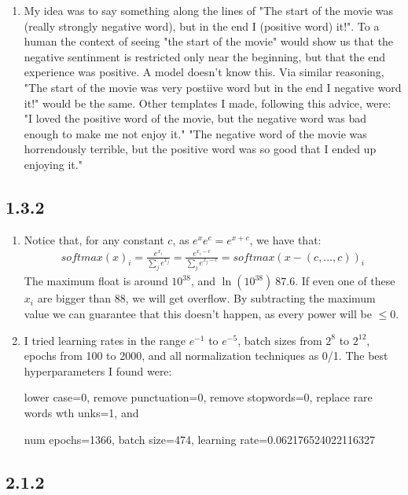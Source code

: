 \documentclass[12pt]{article}
\theoremstyle{definitionstyle}
\begin{document}
\begin{enumerate}[leftmargin=\labelsep]
        \item My idea was to say something along the lines of "The start of the movie was (really strongly negative word), but in the end I (positive word) it!". To a human the context of seeing "the start of the movie" would show us that the negative sentinment is restricted only near the beginning, but that the end experience was positive. A model doesn't know this. Via similar reasoning, "The start of the movie was {very postiive word} but in the end I {negative word} it!" would be the same. Other templates I made, following this advice, were:
        "I loved the {positive word} of the movie, but the {negative word} was bad enough to make me not enjoy it."
        "The {negative word} of the movie was horrendously terrible, but the {positive word} was so good that I ended up enjoying it."
    \end{enumerate}
    

    \subsection*{1.3.2} 
    \begin{enumerate}
        \item Notice that, for any constant $c$, as $e^x e^c = e^{x+c}$, we have that:
        \begin{align*}
            softmax(x)_i = \frac{e^{x_i}}{\sum_j e^{x_j}} = \frac{e^{x_i-c}}{\sum_j e^{x_j-c}} = softmax(x-(c, \ldots, c))_i
        \end{align*}
        The maximum float is around $10^38$, and $\ln(10^38) ~ 87.6$. If even one of these $x_i$ are bigger than $88$, we will get overflow. By subtracting the maximum value we can guarantee that this doesn't happen, as every power will be $\leq 0$. 
        \item I tried learning rates in the range $e^{-1}$ to $e^{-5}$, batch sizes from $2^8$ to $2^{12}$, epochs from 100 to 2000, and all normalization techniques as 0/1. The best hyperparameters I found were:

        lower case=0, remove punctuation=0, remove stopwords=0, replace rare words wth unks=1, and

        num epochs=1366, batch size=474, learning rate=0.062176524022116327
    \end{enumerate}

    \subsection*{2.1.2}
\end{document}
